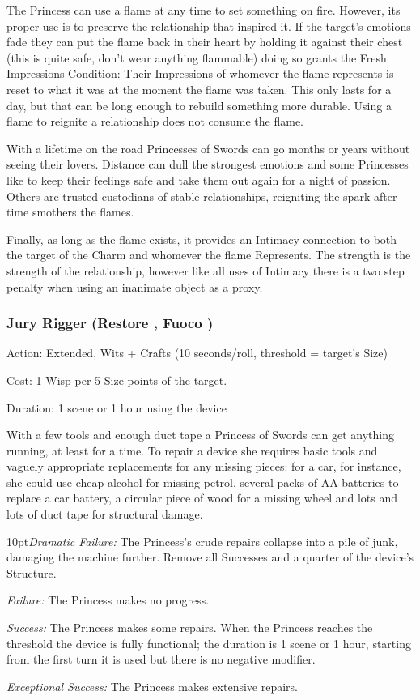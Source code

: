 The Princess can use a flame at any time to set something on fire. However, its proper use is to preserve the relationship that inspired it. If the target's emotions fade they can put the flame back in their heart by holding it against their chest (this is quite safe, don't wear anything flammable) doing so grants the Fresh Impressions Condition: Their Impressions of whomever the flame represents is reset to what it was at the moment the flame was taken. This only lasts for a day, but that can be long enough to rebuild something more durable. Using a flame to reignite a relationship does not consume the flame.

With a lifetime on the road Princesses of Swords can go months or years without seeing their lovers. Distance can dull the strongest emotions and some Princesses like to keep their feelings safe and take them out again for a night of passion. Others are trusted custodians of stable relationships, reigniting the spark after time smothers the flames. 

Finally, as long as the flame exists, it provides an Intimacy connection to both the target of the Charm and whomever the flame Represents. The strength is the strength of the relationship, however like all uses of Intimacy there is a two step penalty when using an inanimate object as a proxy. 

\subsubsection*{Jury Rigger (Restore \textbullet\textbullet, Fuoco \textbullet)}

\noindent Action: Extended, Wits + Crafts (10 seconds/roll, threshold = target's Size)

\noindent Cost: 1 Wisp per 5 Size points of the target.

\noindent Duration: 1 scene or 1 hour using the device

With a few tools and enough duct tape a Princess of Swords can get anything running, at least for a time. To repair a device she requires basic tools and vaguely appropriate replacements for any missing pieces: for a car, for instance, she could use cheap alcohol for missing petrol, several packs of AA batteries to replace a car battery, a circular piece of wood for a missing wheel and lots and lots of duct tape for structural damage.

    \begin{myindentpar}{10pt}\emph{Dramatic Failure:} The Princess's crude repairs collapse into a pile of junk, damaging the machine further. Remove all Successes and a quarter of the device's Structure.

    \emph{Failure:} The Princess makes no progress.

    \emph{Success:} The Princess makes some repairs. When the Princess reaches the threshold the device is fully functional; the duration is 1 scene or 1 hour, starting from the first turn it is used but there is no negative modifier. 

    \emph{Exceptional Success:} The Princess makes extensive repairs.\end{myindentpar}


